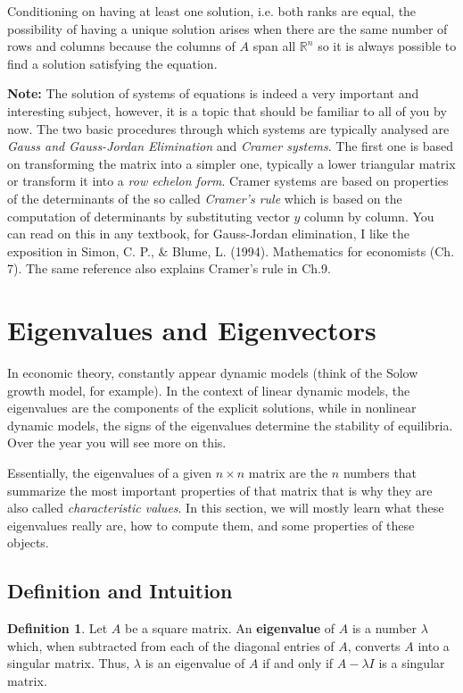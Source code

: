 \documentclass[a4paper,11pt]{article}
\theoremstyle{definition}
\newtheorem{definition}{Definition}
\theoremstyle{plain}
\begin{document}
Conditioning on having at least one solution, i.e. both ranks are equal,
the possibility of having a unique solution arises when there are the
same number of rows and columns because the columns of \(A\) span all
\(\mathbb{R}^n\) so it is always possible to find a solution satisfying
the equation.

\textbf{Note:} The solution of systems of equations is indeed a very
important and interesting subject, however, it is a topic that should be
familiar to all of you by now. The two basic procedures through which
systems are typically analysed are \emph{Gauss and Gauss-Jordan
Elimination} and \emph{Cramer systems}. The first one is based on
transforming the matrix into a simpler one, typically a lower triangular
matrix or transform it into a \emph{row echelon form}. Cramer systems
are based on properties of the determinants of the so called
\emph{Cramer's rule} which is based on the computation of determinants
by substituting vector \(y\) column by column. You can read on this in
any textbook, for Gauss-Jordan elimination, I like the exposition in
Simon, C. P., \& Blume, L. (1994). Mathematics for economists (Ch. 7).
The same reference also explains Cramer's rule in Ch.9.


\section{Eigenvalues and
Eigenvectors}\label{eigenvalues-and-eigenvectors}

In economic theory, constantly appear dynamic models (think of the Solow
growth model, for example). In the context of linear dynamic models, the
eigenvalues are the components of the explicit solutions, while in
nonlinear dynamic models, the signs of the eigenvalues determine the
stability of equilibria. Over the year you will see more on this.

Essentially, the eigenvalues of a given \(n\times n\) matrix are the
\(n\) numbers that summarize the most important properties of that
matrix that is why they are also called \emph{characteristic values}. In
this section, we will mostly learn what these eigenvalues really are,
how to compute them, and some properties of these objects.

\subsection{Definition and Intuition}\label{definition-and-intuition}

\begin{definition}
Let \(A\) be a square matrix. An \textbf{eigenvalue} of \(A\) is a number \(\lambda\) which, when subtracted from each of the diagonal entries of \(A\), converts \(A\)
into a singular matrix. Thus, \(\lambda\) is an eigenvalue of \(A\) if
and only if \(A-\lambda I\) is a singular matrix.
\end{definition}
\end{document}
